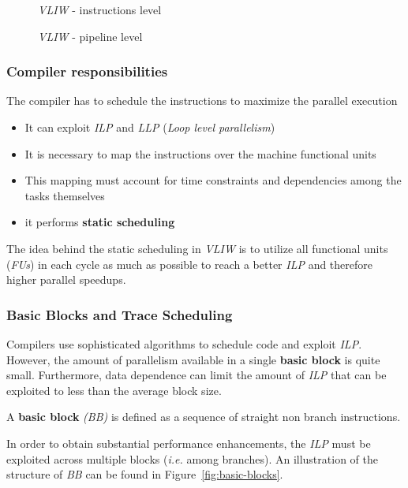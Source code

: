 \documentclass[english]{article}
\begin{document}
\begin{figure}[htbp]
  \bigskip
  \centering
  \caption{\textit{VLIW} - instructions level}
  \label{fig:vliw-instruction-level}
  \bigskip
\end{figure}

\begin{figure}[htbp]
  \bigskip
  \centering
  \caption{\textit{VLIW} - pipeline level}
  \label{fig:vliw-hardware-level}
  \bigskip
\end{figure}

\subsubsection{Compiler responsibilities}

The compiler has to schedule the instructions to maximize the parallel execution
\begin{itemize}
  \item It can exploit \textit{ILP} and \textit{LLP} (\textit{Loop level parallelism})
  \item It is necessary to map the instructions over the machine functional units
  \item This mapping must account for time constraints and dependencies among the tasks themselves
  \item it performs \textbf{static scheduling}
\end{itemize}

The idea behind the static scheduling in \textit{VLIW} is to utilize all functional units (\textit{FUs}) in each cycle as much as possible to reach a better \textit{ILP} and therefore higher parallel speedups.

\subsubsection{Basic Blocks and Trace Scheduling}
\label{sec:trace-scheduling}

Compilers use sophisticated algorithms to schedule code and exploit \textit{ILP}.
However, the amount of parallelism available in a single \textbf{basic block} is quite small.
Furthermore, data dependence can limit the amount of \textit{ILP} that can be exploited to less than the average block size.

A \textbf{basic block} \textit{(BB)} is defined as a sequence of straight non branch instructions.

In order to obtain substantial performance enhancements, the \textit{ILP} must be exploited across multiple blocks (\textit{i.e.} among branches).
An illustration of the structure of \textit{BB} can be found in Figure~\ref{fig:basic-blocks}.
\end{document}
